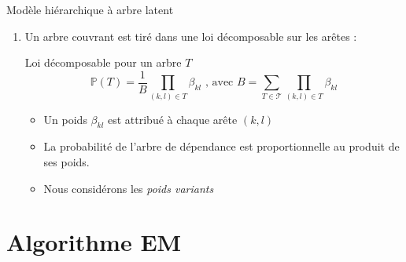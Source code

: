 \documentclass[11pt]{bredelebeamer}
\begin{document}
\begin{frame}{Modèle hiérarchique  à arbre latent}

\begin{enumerate}
    \item Un arbre couvrant est tiré dans une loi décomposable sur les arêtes :
   \begin{block}{Loi décomposable pour un arbre $T$ \cite{MeilaJaak}}\normalsize{
    \[ \mathds{P}(T) = \frac{1}{B}\prod_{(k,l)\in T} \beta_{kl} \text{ , avec } B = \sum_{T\in\mathcal{T}} \prod_{(k,l)\in T} \beta_{kl} \]}
    \end{block}
\begin{itemize}
    \item Un poids $\beta_{kl}$ est attribué à chaque arête $(k,l)$
    \item La probabilité de l'arbre de dépendance est proportionnelle au produit de ses poids.
    \item Nous considérons les \emph{ poids variants}
\end{itemize}
\end{enumerate}
    
\end{frame}




\section{Algorithme EM}
\end{document}

